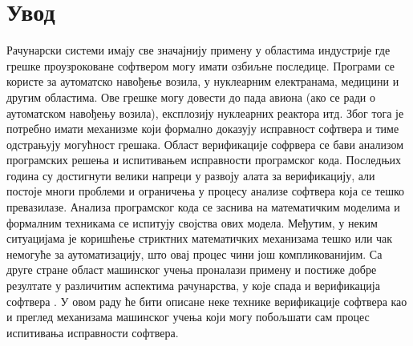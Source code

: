 \documentclass[a4paper]{article}
\begin{document}
{%

\tableofcontents

\newpage

\section{Увод}
Рачунарски системи имају све значајнију примену у областима индустрије где грешке проузроковане софтвером могу имати озбиљне последице. Програми се користе за аутоматско навођење возила, у нуклеарним електранама, медицини и другим областима. Ове грешке могу довести до пада авиона (ако се ради о аутоматском навођењу возила), експлозију нуклеарних реактора итд. Због тога је потребно имати механизме који формално доказују исправност софтвера и тиме одстрањују могућност грешака. Област верификације софрвера се бави анализом програмских решења и испитивањем исправности програмског кода. Последњих година су достигнути велики напреци у развоју алата за верификацију, али постоје многи проблеми и ограничења у процесу анализе софтвера која се тешко превазилазе. Анализа програмског кода се заснива на математичким моделима и формалним техникама се испитују својства ових модела. Међутим, у неким ситуацијама је коришћење стриктних математичких механизама тешко или чак немогуће за аутоматизацију, што овај процес чини још компликованијим. Са друге стране област машинског учења проналази примену и постиже добре резултате у различитим аспектима рачунарства, у које спада и верификација софтвера \cite{old-cv} \cite{new-cv}.  У овом раду ће бити описане неке технике верификације софтвера као и преглед механизама машинског учења који могу побољшати сам процес испитивања исправности софтвера.
}
\end{document}
